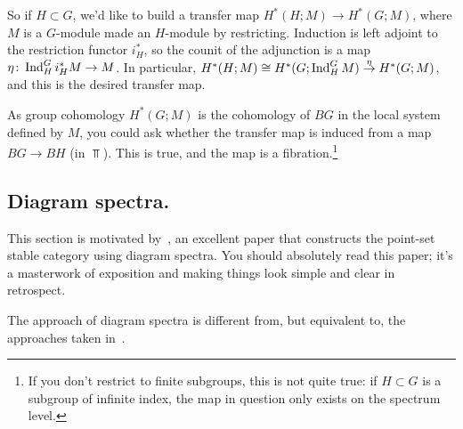 So if $H\subset G$, we'd like to build a transfer map $H^*(H;M)\to H^*(G;M)$, where $M$ is a $G$-module made an
$H$-module by restricting. Induction is left adjoint to the restriction functor $i_H^*$, so the counit of the
adjunction is a map $\eta\colon\operatorname{Ind}_H^G i_H^*M\to M$. In particular, $H^*(H;M)\cong H^*(G;\operatorname{Ind}_H^G
M)\stackrel\eta\to H^*(G;M)$, and this is the desired transfer map.

As group cohomology $H^*(G;M)$ is the cohomology of $BG$ in the local system defined by $M$, you could ask whether
the transfer map is induced from a map $BG\to BH$ (in $\Top$). This is true, and the map is a
fibration.\footnote{If you don't restrict to finite subgroups, this is not quite true: if $H\subset G$ is a
subgroup of infinite index, the map in question only exists on the spectrum level.}
\subsection*{Diagram spectra.}
This section is motivated by~\cite{MMSS}, an excellent paper that constructs the point-set stable category using
diagram spectra. You should absolutely read this paper; it's a masterwork of exposition and making things look
simple and clear in retrospect.

The approach of diagram spectra is different from, but equivalent to, the approaches taken
in~\cite{LMS,AlaskaNotes}.

